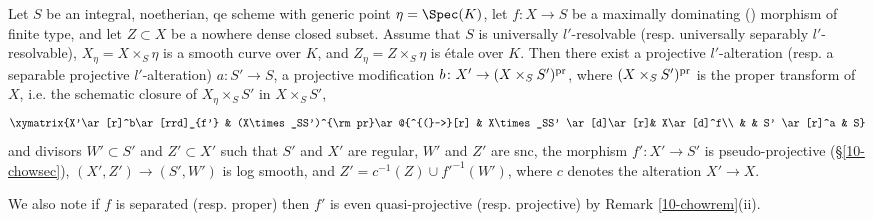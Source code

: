 \documentclass[10pt]{../fichiers-configuration-latex/smfart}
\begin{document}
\begin{theorem}\label{10-relcurveth}
Let $S$ be an integral, noetherian, qe scheme with generic point $\eta=\Spec(K)$,
let $f{\colon}X\to S$ be a maximally dominating () morphism
of finite type, and let $Z\subset X$ be a nowhere dense closed subset. Assume that $S$ is universally
$l'$-resolvable (resp. universally separably $l'$-resolvable), $X_\eta=X\times_S\eta$
is a smooth curve over $K$, and $Z_\eta=Z\times_S\eta$ is étale over $K$. Then there
exist a projective $l'$-alteration (resp. a separable projective $l'$-alteration)
$a{\colon}S'\to S$, a projective modification $b{\colon}X'\to (X\times_SS')^{\rm pr}$,
where $(X\times_SS')^{\rm pr}$ is the proper transform of $X$, i.e. the schematic closure
of $X_\eta\times_SS'$ in $X\times_SS'$,
\begin{equation*}
\xymatrix{X'\ar[r]^b\ar[rrd]_{f'} & (X\times_SS')^{\rm pr}\ar@{^{(}->}[r] & X\times_SS' \ar[d]\ar[r]& X\ar[d]^f\\
& & S' \ar[r]^a & S}
\end{equation*}
and divisors $W'\subset S'$ and $Z'\subset X'$ such that $S'$ and $X'$ are regular,
$W'$ and $Z'$ are snc, the morphism $f'{\colon}X'\to S'$ is pseudo-projective
(\S\ref{10-chowsec}), $(X',Z')\to(S',W')$ is log smooth, and $Z'=c^{-1}(Z)\cup f'^{-1}(W')$,
where $c$ denotes the alteration $X'\to X$.
\end{theorem}
We also note if $f$ is separated (resp. proper) then $f'$ is even quasi-projective
(resp. projective) by Remark \ref{10-chowrem}(ii).
\end{document}

